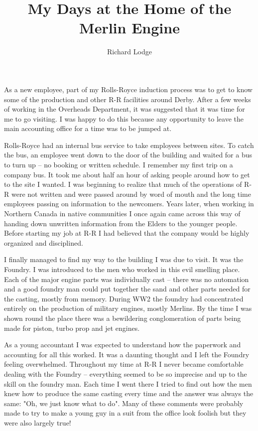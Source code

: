 %


\title{My Days at the Home of the Merlin Engine}
\author{Richard Lodge}

\maketitle

As a new employee, part of my Rolls-Royce induction process was to get
to know some of the production and other R-R facilities around
Derby. After a few weeks of working in the Overheads Department, it
was suggested that it was time for me to go visiting. I was happy to
do this because any opportunity to leave the main accounting office
for a time was to be jumped at.

Rolls-Royce had an internal bus service to take employees between
sites. To catch the bus, an employee went down to the door of the
building and waited for a bus to turn up -- no booking or written
schedule.  I remember my first trip on a company bus. It took me about
half an hour of asking people around how to get to the site I
wanted. I was beginning to realize that much of the operations of R-R
were not written and were passed around by word of mouth and the long
time employees passing on information to the newcomers. Years later,
when working in Northern Canada in native communities I once again
came across this way of handing down unwritten information from the
Elders to the younger people. Before starting my job at R-R I had
believed that the company would be highly organized and disciplined.

I finally managed to find my way to the building I was due to visit.
It was the Foundry. I was introduced to the men who worked in this
evil smelling place. Each of the major engine parts was individually
cast -- there was no automation and a good foundry man could put
together the sand and other parts needed for the casting, mostly from
memory. During WW2 the foundry had concentrated entirely on the
production of military engines, mostly Merlins.  By the time I was
shown round the place there was a bewildering conglomeration of parts
being made for piston, turbo prop and jet engines.

As a young accountant I was expected to understand how the paperwork
and accounting for all this worked. It was a daunting thought and I
left the Foundry feeling overwhelmed.  Throughout my time at R-R I
never became comfortable dealing with the Foundry -- everything seemed
to be so imprecise and up to the skill on the foundry man. Each time I
went there I tried to find out how the men knew how to produce the
same casting every time and the answer was always the same: "Oh, we
just know what to do".  Many of these comments were probably made to
try to make a young guy in a suit from the office look foolish but
they were also largely true!

